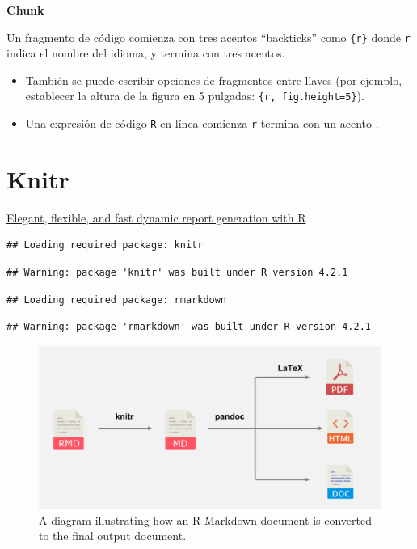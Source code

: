 \documentclass[
]{book}
\begin{document}
\textbf{Chunk}

Un fragmento de código comienza con tres acentos ``backticks'' como \texttt{\textasciigrave{}\textasciigrave{}\textasciigrave{}\{r\}} donde \texttt{r} indica el nombre del idioma, y termina con tres acentos.

\begin{itemize}
\item
  También se puede escribir opciones de fragmentos entre llaves (por ejemplo, establecer la altura de la figura en 5 pulgadas: \texttt{\textasciigrave{}\textasciigrave{}\textasciigrave{}\{r,\ fig.height=5\}}).
\item
  Una expresión de código \texttt{R} en línea comienza \texttt{\textasciigrave{}r} termina con un acento \texttt{\textasciigrave{}}.
\end{itemize}

\hypertarget{knitr}{%
\section{Knitr}\label{knitr}}

\href{https://yihui.org/knitr/}{Elegant, flexible, and fast dynamic report generation with R}

\begin{verbatim}
## Loading required package: knitr
\end{verbatim}

\begin{verbatim}
## Warning: package 'knitr' was built under R version 4.2.1
\end{verbatim}

\begin{verbatim}
## Loading required package: rmarkdown
\end{verbatim}

\begin{verbatim}
## Warning: package 'rmarkdown' was built under R version 4.2.1
\end{verbatim}

\begin{figure}
\includegraphics[width=1\linewidth]{images/workflow} \caption{A diagram illustrating how an R Markdown document is converted to the final output document.}\label{fig:rmdworkflow}
\end{figure}
\end{document}

